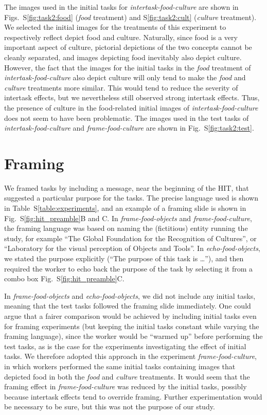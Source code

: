 \documentclass{pnastwo}
\begin{document}
\begin{article}
\begin{materials}
The images used in the initial tasks for \textit{intertask-food-culture} are
shown in Figs.~S\ref{fig:task2:food} (\textit{food} treatment) and
S\ref{fig:task2:cult} (\textit{culture} treatment).  We selected the initial
images for the treatments of this experiment to respectively reflect depict
food and culture.  Naturally, since food is a very important aspect of culture,
pictorial depictions of the two concepts cannot be cleanly separated, and
images depicting food inevitably also depict culture.  However, the fact that
the images for the initial tasks in the \textit{food} treatment of
\textit{intertask-food-culture} also depict culture will only tend to make the
\textit{food} and \textit{culture} treatments more similar.  This would tend to
reduce the severity of intertask effects, but we nevertheless still observed
strong intertask effects.  Thus, the presence of culture in the food-related
initial images of \textit{intertask-food-culture} does not seem to have been
problematic.  The images used in the test tasks of
\textit{intertask-food-culture} and \textit{frame-food-culture} are shown in
Fig.~S\ref{fig:task2:test}.

\section{Framing} We framed tasks by including a message, near the beginning
of the HIT, that suggested a particular purpose for the tasks.  The precise
language used is shown in Table~S\ref{table:experiments}, and an example of a
framing slide is shown in Fig.~S\ref{fig:hit_preamble}B and C.  In
\textit{frame-food-objects} and \textit{frame-food-culture}, the framing
language was based on naming the (fictitious) entity running the study, for
example ``The Global Foundation for the Recognition of Cultures'', or
``Laboratory for the visual perception of Objects and Tools''.  In
\textit{echo-food-objects}, we stated the purpose explicitly (``The purpose of
this task is \dots''), and then required the worker to echo back the purpose of
the task by selecting it from a combo box Fig.~S\ref{fig:hit_preamble}C.

In \textit{frame-food-objects} and \textit{echo-food-objects}, we did not
include any initial tasks, meaning that the test tasks followed the framing
slide immediately.  One could argue that a fairer comparison would be achieved
by including initial tasks even for framing experiments (but keeping the
initial tasks constant while varying the framing language), since the worker
would be ``warmed up'' before performing the test tasks, as is the case for the
experiments investigating the effect of initial tasks.  We therefore adopted
this approach in the experiment \textit{frame-food-culture}, in which workers
performed the same initial tasks containing images that depicted food in both
the \textit{food} and \textit{culture} treatments.  It would seem that the
framing effect in \textit{frame-food-culture} was reduced by the initial tasks,
possibly because intertask effects tend to override framing. Further
experimentation would be necessary to be sure, but this was not the purpose of
our study.


\end{materials}
\end{article}
\end{document}
